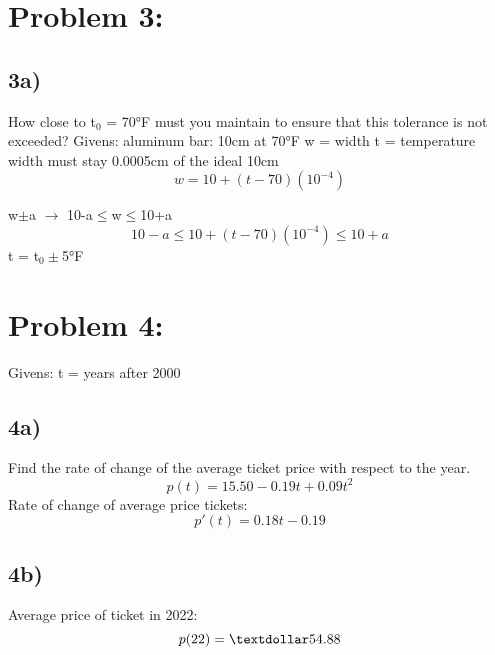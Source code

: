 \documentclass{article}
\begin{document}
\newpage

\section*{Problem 3:}
\subsection*{3a)} How close to t$_0$ = 70°F must you maintain to ensure that this tolerance is not exceeded?
\newline \newline
Givens:
\newline aluminum bar: 10cm at 70°F
\newline
w = width
\newline
t = temperature
\newline
width must stay 0.0005cm of the ideal 10cm
\begin{equation}
    w = 10+(t-70)(10^{-4})
\end{equation}

w$\pm$a $\rightarrow$ 10-a$\leq$w$\leq$10+a
\begin{equation}
    10-a\leq 10+(t-70)(10^{-4})\leq10+a
\end{equation}
t = t$_0 \pm $5°F

\newpage

\section*{Problem 4:}
Givens:
\newline
t = years after 2000
\subsection*{4a)} Find the rate of change of the average ticket price with respect to the year.
\begin{equation}
    p(t) = 15.50-0.19t+0.09t^2
\end{equation}
\newline Rate of change of average price tickets:
\begin{equation}
    p'(t) = 0.18t-0.19
\end{equation}

\subsection*{4b)} Average price of ticket in 2022:
\begin{equation}
    p(22) = \textdollar54.88
\end{equation}
\end{document}
